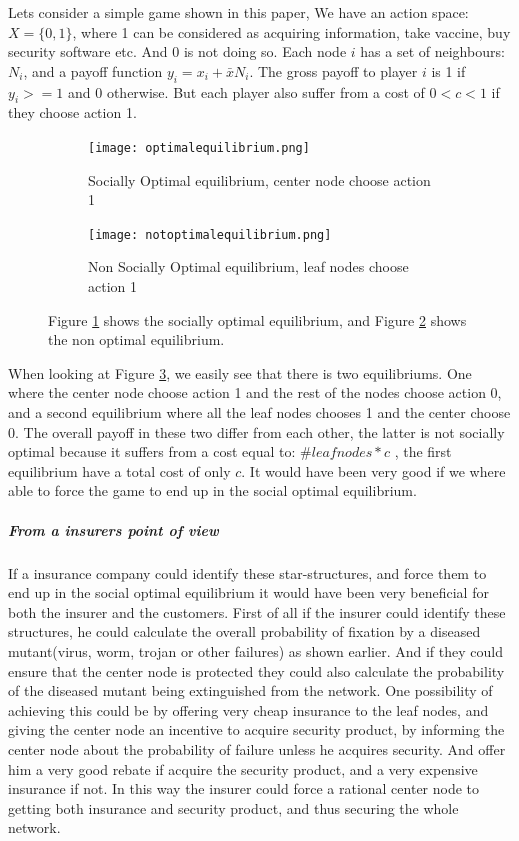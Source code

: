 Lets consider a simple game shown in this paper,
We have an action space: $X=\{0,1\}$, where 1 can be considered as acquiring information, take vaccine, buy security software etc. And 0 is not doing so.
Each node $i$ has a set of neighbours: $N_{i} $, and a payoff function $y_{i}=x_{i}+\bar{x}N_{i}$. 
The gross payoff to player $i$ is 1 if $y_{i}>=1$ and 0 otherwise. But each player also suffer from a cost of $0<c<1$ if they choose action 1.
\begin{figure}[h]
\centering
\begin{subfigure}{.4\textwidth}
  \centering
  \texttt{[image: optimalequilibrium.png]}
  \caption{\label{fig:optequi} Socially Optimal equilibrium, center node choose action 1}
\end{subfigure}
\quad
\begin{subfigure}{.4\textwidth}
  \centering
  \texttt{[image: notoptimalequilibrium.png]}
  \caption{\label{fig:notoptequi} Non Socially Optimal equilibrium, leaf nodes choose action 1}
\end{subfigure}
\caption{\label{fig:starequi} Figure \ref{fig:optequi} shows the socially optimal equilibrium, and Figure \ref{fig:notoptequi} shows the non optimal equilibrium.}

\end{figure}
When looking at Figure \ref{fig:starequi}, we easily see that there is two equilibriums. One where the center node choose action 1 and the rest of the nodes choose action 0, and a second equilibrium where all the leaf nodes chooses 1 and the center choose 0.
The overall payoff in these two differ from each other, the latter is not socially optimal because it
 suffers from a cost equal to: $\#leaf nodes*c$ , the first equilibrium have a total cost of only $c$.
 It would have been very good if we where able to force the game to end up in the social optimal equilibrium.
\subparagraph{From a insurers point of view}
If a insurance company could identify these star-structures, and force them to end up in the social optimal equilibrium it would have been very beneficial for both the insurer and the customers.
First of all if the insurer could identify these structures, he could calculate the overall probability of fixation by a diseased mutant(virus, worm, trojan or other failures) as shown earlier. And if they could ensure that the center node is protected they could also calculate the probability of the diseased mutant being extinguished from the network.
One possibility of achieving this could be by offering very cheap insurance to the leaf nodes, and giving the center node an incentive to acquire security product, by informing the center node about the probability of failure unless he acquires security. And offer him a very good rebate if acquire the security product, and a very expensive insurance if not. In this way the insurer could force a rational center node to getting both insurance and security product, and thus securing the whole network.

